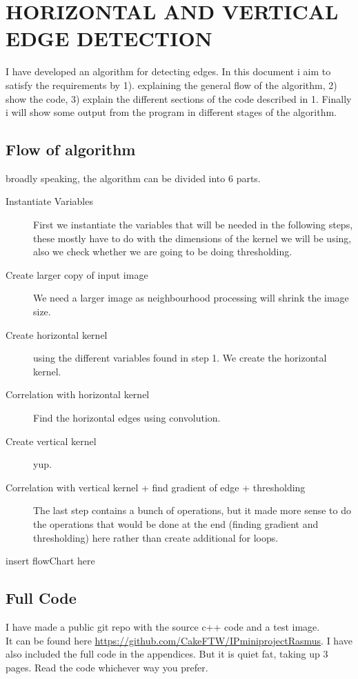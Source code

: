 \documentclass{article}
\begin{document}
\section{HORIZONTAL AND VERTICAL EDGE DETECTION }	
I have developed an algorithm for detecting edges. In this document i aim to satisfy the requirements by 1). explaining the general flow of the algorithm, 2) show the code, 3) explain the different sections of the code described in 1. Finally i will show some output from the program in different stages of the algorithm.

\subsection{Flow of algorithm}
broadly speaking, the algorithm can be divided into 6 parts.
\begin{description}
	\item [Instantiate Variables] First we instantiate the variables that will be needed in the following steps, these mostly have to do with the dimensions of the kernel we will be using, also we check whether we are going to be doing thresholding.
	\item [Create larger copy of input image] We need a larger image as neighbourhood processing will shrink the image size.
	\item [Create horizontal kernel] using the different variables found in step 1. We create the horizontal kernel.
	\item [Correlation with horizontal kernel] Find the horizontal edges using convolution.
	\item [Create vertical kernel] yup.
	\item [Correlation with vertical kernel + find gradient of edge + thresholding] The last step contains a bunch of operations, but it made more sense to do the operations that would be done at the end (finding gradient and thresholding) here rather than create additional for loops.
\end{description}

insert flowChart here
\subsection{Full Code}
I have made a public git repo with the source c++ code and a test image.\\ It can be found here \url{https://github.com/CakeFTW/IPminiprojectRasmus}. 
I have also included the full code in the appendices. But it is quiet fat, taking up 3 pages. Read the code whichever way you prefer.
\end{document}
